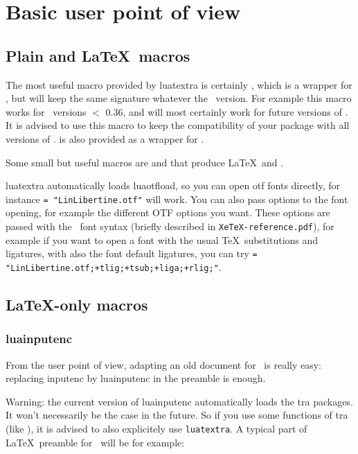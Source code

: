 \documentclass{article}
\makeatletter
\newlength\xxt@kern@Te
\newlength\xxt@kern@eX
\newlength\xxt@lower@e
\DeclareRobustCommand\XeTeX{%
  \leavevmode
  \smash{%
   X\lower\xxt@lower@e
   \hbox{\kern\xxt@kern@eX
   \setbox0=\hbox{E}\dimen0=\ht0\advance\dimen0by\dp0%
   \raise\dimen0\hbox{\rotatebox{180}{\box0}}%
   }\kern\xxt@kern@Te\TeX}}%
\makeatother
\begin{document}
\section{Basic user point of view}

\subsection{Plain and \LaTeX\ macros}

The most useful macro provided by \textsf{luatextra} is certainly \texttt{\string\luadirect}, which is a wrapper for \texttt{\string\directlua}, but will keep the same signature whatever the \LuaTeX\ version. For example this macro works for \LuaTeX\ versions $<$ 0.36, and will most certainly work for future versions of \LuaTeX . It is advised to use this macro to keep the compatibility of your package with all versions of \LuaTeX . \texttt{\string\lualate} is also provided as a wrapper for \texttt{\string\latelua}.

Some small but useful macros are \texttt{\string\LuaTeX} and \texttt{\string\LuaLaTeX} that produce \LaTeX\ and \LuaLaTeX .

\textsf{luatextra} automatically loads \textsf{luaotfload}, so you can open otf fonts directly, for instance \texttt{\string\font\string\foo = "LinLibertine.otf"\string\foo} will work. You can also pass options to the font opening, for example the different OTF options you want. These options are passed with the \XeTeX\ font syntax (briefly described in \texttt{XeTeX-reference.pdf}), for example if you want to open a font with the usual \TeX\ substitutions and ligatures, with also the font default ligatures, you can try \newline \texttt{\string\font\string\foo = "LinLibertine.otf;+tlig;+tsub;+liga;+rlig;"\string\foo}.

\subsection{\LaTeX -only macros}

\subsubsection{luainputenc}

From the user point of view, adapting an old document for \LuaTeX\ is really easy: replacing \textsf{inputenc} by \textsf{luainputenc} in the preamble is enough.

\textsf{Warning:} the current version of \textsf{luainputenc} automatically loads the \LuaTeX tra packages. It won't necessarily be the case in the future. So if you use some functions of \LuaTeX tra (like \texttt{\string\newluaattribute}), it is advised to also explicitely use \texttt{luatextra}. A typical part of \LaTeX\ preamble for \LuaTeX\ will be for example:
\end{document}

